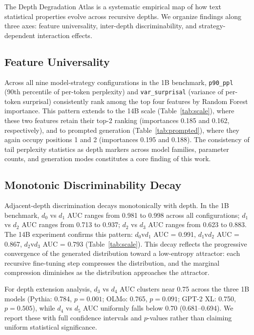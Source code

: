 \documentclass[11pt,a4paper]{article}
\begin{document}
The Depth Degradation Atlas is a systematic empirical map of how text statistical properties evolve across recursive depths. We organize findings along three axes: feature universality, inter-depth discriminability, and strategy-dependent interaction effects.

\subsection{Feature Universality}

Across all nine model-strategy configurations in the 1B benchmark, \texttt{p90\_ppl} (90th percentile of per-token perplexity) and \texttt{var\_surprisal} (variance of per-token surprisal) consistently rank among the top four features by Random Forest importance. This pattern extends to the 14B scale (Table~\ref{tab:scale}), where these two features retain their top-2 ranking (importances 0.185 and 0.162, respectively), and to prompted generation (Table~\ref{tab:prompted}), where they again occupy positions 1 and 2 (importances 0.195 and 0.188). The consistency of tail perplexity statistics as depth markers across model families, parameter counts, and generation modes constitutes a core finding of this work.

\subsection{Monotonic Discriminability Decay}

Adjacent-depth discrimination decays monotonically with depth. In the 1B benchmark, $d_0$ vs $d_1$ AUC ranges from 0.981 to 0.998 across all configurations; $d_1$ vs $d_2$ AUC ranges from 0.713 to 0.937; $d_2$ vs $d_3$ AUC ranges from 0.623 to 0.883. The 14B experiment confirms this pattern: $d_0$v$d_1$ AUC = 0.991, $d_1$v$d_2$ AUC = 0.867, $d_2$v$d_3$ AUC = 0.793 (Table~\ref{tab:scale}). This decay reflects the progressive convergence of the generated distribution toward a low-entropy attractor: each recursive fine-tuning step compresses the distribution, and the marginal compression diminishes as the distribution approaches the attractor.

For depth extension analysis, $d_3$ vs $d_4$ AUC clusters near 0.75 across the three 1B models (Pythia: 0.784, $p=0.001$; OLMo: 0.765, $p=0.091$; GPT-2 XL: 0.750, $p=0.505$), while $d_4$ vs $d_5$ AUC uniformly falls below 0.70 (0.681--0.694). We report these with full confidence intervals and $p$-values rather than claiming uniform statistical significance.
\end{document}
